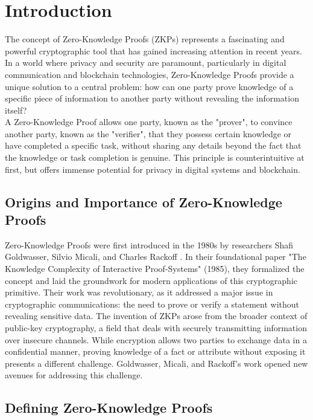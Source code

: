 \section{Introduction}
\justify
The concept of Zero-Knowledge Proofs (ZKPs) represents a fascinating and powerful cryptographic tool that has gained increasing attention in recent years. In a world where privacy and security are paramount, particularly in digital communication and blockchain technologies, Zero-Knowledge Proofs provide a unique solution to a central problem: how can one party prove knowledge of a specific piece of information to another party without revealing the information itself?
\\
A Zero-Knowledge Proof allows one party, known as the "prover", to convince another party, known as the "verifier", that they possess certain knowledge or have completed a specific task, without sharing any details beyond the fact that the knowledge or task completion is genuine. This principle is counterintuitive at first, but offers immense potential for privacy in digital systems and blockchain.

\subsection{Origins and Importance of Zero-Knowledge Proofs}

Zero-Knowledge Proofs were first introduced in the 1980s by researchers Shafi Goldwasser, Silvio Micali, and Charles Rackoff \cite{GMR85}. In their foundational paper "The Knowledge Complexity of Interactive Proof-Systems" (1985), they formalized the concept and laid the groundwork for modern applications of this cryptographic primitive. Their work was revolutionary, as it addressed a major issue in cryptographic communications: the need to prove or verify a statement without revealing sensitive data.
The invention of ZKPs arose from the broader context of public-key cryptography, a field that deals with securely transmitting information over insecure channels. While encryption allows two parties to exchange data in a confidential manner, proving knowledge of a fact or attribute without exposing it presents a different challenge. Goldwasser, Micali, and Rackoff’s work opened new avenues for addressing this challenge.

\subsection{Defining Zero-Knowledge Proofs}


